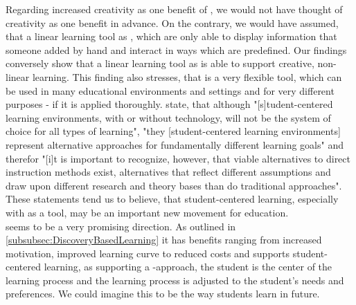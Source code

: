 Regarding increased creativity as one benefit of \AR \appsns, we would not have thought of creativity as one benefit in advance. On the contrary, we would have assumed, that a linear learning tool as \AR \appsns, which are only able to display information that someone added by hand and interact in ways which are predefined. Our findings conversely show that a linear learning tool as \AR \apps is able to support creative, non-linear learning. This finding also stresses, that \AR is a very flexible tool, which can be used in many educational environments and settings and for very different purposes - if it is applied thoroughly. \cite{Hannafin.1997} state, that although "[s]tudent-centered learning environments, with or without technology, will not be the system of choice for all types of learning"\autocite[\label{fn:Hannafin_1997_197}p. 197]{Hannafin.1997}, "they [student-centered learning environments] represent alternative approaches for fundamentally different learning goals" and therefor "[i]t is important to recognize, however, that viable alternatives to direct instruction methods exist, alternatives that reflect different assumptions and draw upon different research and theory bases than do traditional approaches". These statements tend us to believe, that student-centered learning, especially with \AR as a tool, may be an important new movement for education.
\\
%
\DBL seems to be a very promising \AR direction. As outlined in \ref{subsubsec:DiscoveryBasedLearning} it has benefits ranging from increased motivation, improved learning curve to reduced costs and supports student-centered learning, as supporting a \DBLns-approach, the student is the center of the learning process and the learning process is adjusted to the student's needs and preferences. We could imagine this to be the way students learn in future. \\
